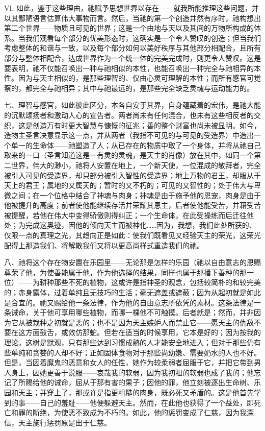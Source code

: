 VI. 如此，鉴于这些理由，祂赋予思想世界以存在——就我所能推理这些问题，并以其鄙陋语言估算伟大事物而言。然后，当祂的第一个创造井然有序时，祂构想出第二个世界——物质且可见的世界；这是一个由地与天以及其间的万物所构成的体系。当我们观看每个部分的优美形态时，这确实是一个令人赞叹的创造；但当我们考虑整体的和谐与一致，以及每个部分如何以美好秩序与其他部分相配合，且所有部分与整体相配合，达成世界作为一个统一体的完美完成时，则更令人赞叹。这是要表明，祂不仅能召唤出一种与祂相似的本性，也能召唤出一种完全与祂相异的本性。因为与天主相似的，是那些理智的、仅由心灵可理解的本性；而所有感官可觉察的，都完全与祂相异；其中与祂最远的，是那些完全缺乏灵魂与运动能力的。\par

七、理智与感官，如此彼此区分，本各自安于其界，自身蕴藏着的宏伟，是祂大能的沉默颂扬者和激动人心的宣告者。两者尚未有任何混合，也未有这些相反者的交织，这是创造万有时更大智慧与慷慨的征兆；善的整个财富也尚未被显明。如今，造物主圣言决意显示这一点，并从两者（我指不可见的与可见的受造界）中造出一个单一的生命体——祂塑造了人；从已存在的物质中取了一个身体，并将从祂自己取来的一口（圣言知道这是一有灵的灵魂，是天主的肖像）放在其中，如同一个第二世界，伟大的渺小，祂将人安置在地上，一个新天使，一位混成的敬拜者，完全被引入可见的受造界，却只部分被引入智性的受造界；地上万物的君王，却服从于天上的君王；属地的又属天的；暂时的又不朽的；可见的又智性的；处于伟大与卑微之间；在一个位格中结合了神魂与肉身；神魂是由于施予他的恩宠，肉身是由于他被提升的高度；前者使他能继续存活并荣耀其恩主，后者使他能受苦，并藉受苦被提醒，若他在伟大中变得骄傲则得纠正；一个生命体，在此受操练而后迁往他处；为完成这奥迹，因他的倾向天主而被神化……因为，我想，我们此处所获的、仅限一点的真理之光，其趋向正是如此：使我们既看见又经验天主的荣光，这荣光配得上那造我们、将解散我们又将以更高尚样式重造我们的祂。\par

八、祂将这个存在物安置在乐园里——无论那是怎样的乐园（祂以自由意志的恩赐尊荣了他，为使善能属于他，作为他选择的结果，同样也属于那播下善种的那一位）——为耕种那些不死的植物，这或许是指神圣的观念，包括较简朴的和较完美的；赤身露体，过着单纯且无技巧的生活；毫无遮盖或遮蔽；因为从起初就是如此是合宜的。祂又赐给他一条法律，作为他的自由意志所依凭的素材。这条法律是一条诫命，关于他可享用哪些植物，而哪一棵他不可触摸。后者就是；然而，并非因为它从被栽种之初就是恶的；也不是因为天主嫉妒人而禁止它——愿天主的仇敌不要在这方面鼓舌，或效仿那蛇。但若在适当的时候享用，它本是好的；因为按我的理论，这树是默观，只有那些达到习惯成熟的人才能安全地进入；但对于那些仍有些单纯和贪婪的人却不好；正如固体食物对于那些尚幼嫩、需要奶水的人也不好。但是，当因着魔鬼的恶意和女人的任性，她作为较柔弱者屈服于它，并把它带到男人身上，因她更善于说服——哀哉我的软弱，因为我初祖的软弱也成了我的；他忘记了所赐给他的诫命，屈从于那有害的果子；因他的罪，他立刻被逐出生命树、乐园和天主；并穿上了，那或许是指更粗糙的肉身，既必死又矛盾的。这是他首先学到的事——自己的羞耻——他便躲避天主。然而，在此他也获得了一个益处，即死亡和罪的断绝，为使恶不致成为不朽的。如此，他的惩罚变成了仁慈，因为我深信，天主施行惩罚原是出于仁慈。\par

